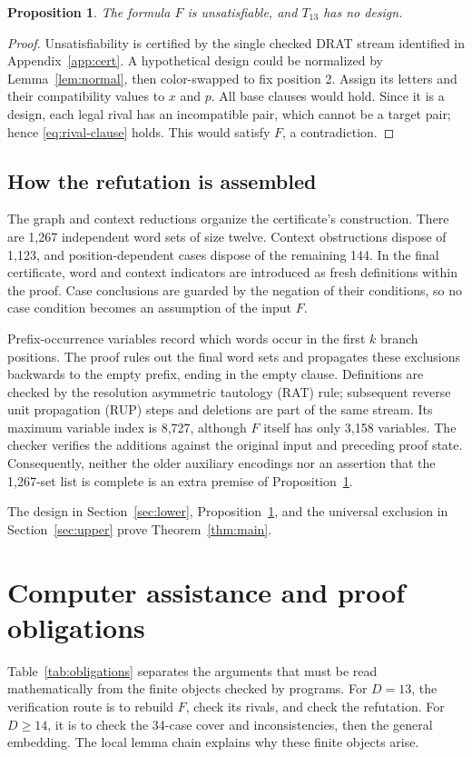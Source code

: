 \documentclass[11pt,a4paper]{article}
\newtheorem{proposition}[theorem]{Proposition}
\theoremstyle{definition}
\begin{document}
\begin{proposition}\label{prop:d13}
The formula $F$ is unsatisfiable, and $T_{13}$ has no design.
\end{proposition}
\begin{proof}
Unsatisfiability is certified by the single checked DRAT stream
identified in Appendix~\ref{app:cert}. A hypothetical design could be
normalized by Lemma~\ref{lem:normal}, then color-swapped to fix position
2. Assign its letters and their compatibility values to $x$ and $p$.
All base clauses would hold. Since it is a design, each legal rival
has an incompatible pair, which cannot be a target pair; hence
\eqref{eq:rival-clause} holds. This would satisfy $F$, a contradiction.
\end{proof}

\subsection{How the refutation is assembled}
The graph and context reductions organize the certificate's construction.
There are 1,267 independent word sets of size twelve. Context
obstructions dispose of 1,123, and position-dependent cases dispose of
the remaining 144. In the final certificate, word and context indicators
are introduced as fresh definitions within the proof. Case conclusions
are guarded by the negation of their conditions, so no case condition
becomes an assumption of the input $F$.

Prefix-occurrence variables record which words occur in the first $k$
branch positions. The proof rules out the final word sets and propagates
these exclusions backwards to the empty prefix, ending in the empty
clause. Definitions are checked by the resolution asymmetric tautology
(RAT) rule; subsequent reverse unit propagation (RUP) steps and
deletions are part of the same stream. Its maximum variable index is
8,727, although $F$ itself has only 3,158 variables. The checker verifies
the additions against the original input and preceding proof state.
Consequently, neither the older auxiliary encodings nor an assertion
that the 1,267-set list is complete is an extra premise of
Proposition~\ref{prop:d13}.

The design in Section~\ref{sec:lower}, Proposition~\ref{prop:d13}, and
the universal exclusion in Section~\ref{sec:upper} prove
Theorem~\ref{thm:main}.

\section{Computer assistance and proof obligations}\label{sec:obligations}
Table~\ref{tab:obligations} separates the arguments that must be read
mathematically from the finite objects checked by programs.
For $D=13$, the verification route is to rebuild $F$, check its rivals,
and check the refutation. For $D\geq14$, it is to check the 34-case
cover and inconsistencies, then the general embedding. The local
lemma chain explains why these finite objects arise.
\end{document}
